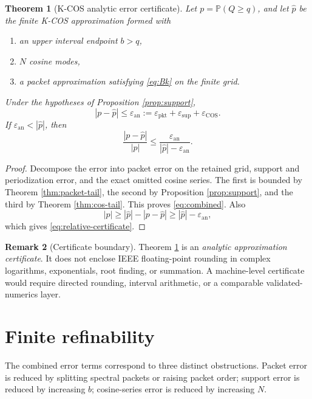 \documentclass[11pt]{article}
\newtheorem{theorem}{Theorem}[section]
\theoremstyle{definition}
\newtheorem{remark}[theorem]{Remark}
\newcommand{\Pp}{\mathbb P}
\newcommand{\eps}{\varepsilon}
\begin{document}
\begin{theorem}[K-COS analytic error certificate]
\label{thm:combined}
Let $p=\Pp(Q\ge q)$, and let $\widehat p$ be the finite K-COS approximation formed with
\begin{enumerate}[label=(\roman*)]
\item an upper interval endpoint $b>q$,
\item $N$ cosine modes,
\item a packet approximation satisfying \eqref{eq:Bk} on the finite grid.
\end{enumerate}
Under the hypotheses of Proposition \ref{prop:support},
\begin{equation}
|p-\widehat p|
\le
\eps_{\mathrm{an}}
:=\eps_{\mathrm{pkt}}+\eps_{\mathrm{sup}}+\eps_{\mathrm{COS}}.
\label{eq:combined}
\end{equation}
If $\eps_{\mathrm{an}}<|\widehat p|$, then
\begin{equation}
\frac{|p-\widehat p|}{|p|}
\le
\frac{\eps_{\mathrm{an}}}
{|\widehat p|-\eps_{\mathrm{an}}}.
\label{eq:relative-certificate}
\end{equation}
\end{theorem}

\begin{proof}
Decompose the error into packet error on the retained grid, support and periodization error, and the exact omitted cosine series. The first is bounded by Theorem \ref{thm:packet-tail}, the second by Proposition \ref{prop:support}, and the third by Theorem \ref{thm:cos-tail}. This proves \eqref{eq:combined}. Also
\[
|p|\ge |\widehat p|-|p-\widehat p|
\ge |\widehat p|-\eps_{\mathrm{an}},
\]
which gives \eqref{eq:relative-certificate}.
\end{proof}

\begin{remark}[Certificate boundary]
Theorem \ref{thm:combined} is an \emph{analytic approximation certificate}. It does not enclose IEEE floating-point rounding in complex logarithms, exponentials, root finding, or summation. A machine-level certificate would require directed rounding, interval arithmetic, or a comparable validated-numerics layer.
\end{remark}

\section{Finite refinability}

The combined error terms correspond to three distinct obstructions. Packet error is reduced by splitting spectral packets or raising packet order; support error is reduced by increasing $b$; cosine-series error is reduced by increasing $N$.
\end{document}
